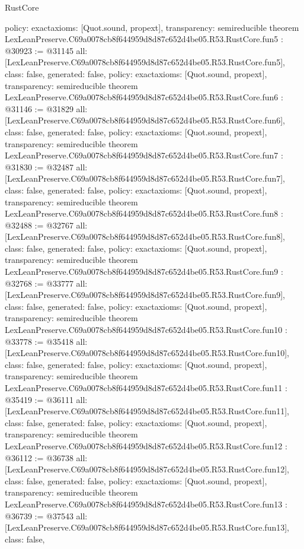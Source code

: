 \begin{lexlean}{RustCore}
\begin{coremodule}
{  policy: exact{axioms: [Quot.sound, propext]},
  transparency: semireducible
}
theorem LexLeanPreserve.C69a0078cb8f644959d8d87c652d4be05.R53.RustCore.fun5 : @30923 := @31145 {
  all: [LexLeanPreserve.C69a0078cb8f644959d8d87c652d4be05.R53.RustCore.fun5],
  class: false,
  generated: false,
  policy: exact{axioms: [Quot.sound, propext]},
  transparency: semireducible
}
theorem LexLeanPreserve.C69a0078cb8f644959d8d87c652d4be05.R53.RustCore.fun6 : @31146 := @31829 {
  all: [LexLeanPreserve.C69a0078cb8f644959d8d87c652d4be05.R53.RustCore.fun6],
  class: false,
  generated: false,
  policy: exact{axioms: [Quot.sound, propext]},
  transparency: semireducible
}
theorem LexLeanPreserve.C69a0078cb8f644959d8d87c652d4be05.R53.RustCore.fun7 : @31830 := @32487 {
  all: [LexLeanPreserve.C69a0078cb8f644959d8d87c652d4be05.R53.RustCore.fun7],
  class: false,
  generated: false,
  policy: exact{axioms: [Quot.sound, propext]},
  transparency: semireducible
}
theorem LexLeanPreserve.C69a0078cb8f644959d8d87c652d4be05.R53.RustCore.fun8 : @32488 := @32767 {
  all: [LexLeanPreserve.C69a0078cb8f644959d8d87c652d4be05.R53.RustCore.fun8],
  class: false,
  generated: false,
  policy: exact{axioms: [Quot.sound, propext]},
  transparency: semireducible
}
theorem LexLeanPreserve.C69a0078cb8f644959d8d87c652d4be05.R53.RustCore.fun9 : @32768 := @33777 {
  all: [LexLeanPreserve.C69a0078cb8f644959d8d87c652d4be05.R53.RustCore.fun9],
  class: false,
  generated: false,
  policy: exact{axioms: [Quot.sound, propext]},
  transparency: semireducible
}
theorem LexLeanPreserve.C69a0078cb8f644959d8d87c652d4be05.R53.RustCore.fun10 : @33778 := @35418 {
  all: [LexLeanPreserve.C69a0078cb8f644959d8d87c652d4be05.R53.RustCore.fun10],
  class: false,
  generated: false,
  policy: exact{axioms: [Quot.sound, propext]},
  transparency: semireducible
}
theorem LexLeanPreserve.C69a0078cb8f644959d8d87c652d4be05.R53.RustCore.fun11 : @35419 := @36111 {
  all: [LexLeanPreserve.C69a0078cb8f644959d8d87c652d4be05.R53.RustCore.fun11],
  class: false,
  generated: false,
  policy: exact{axioms: [Quot.sound, propext]},
  transparency: semireducible
}
theorem LexLeanPreserve.C69a0078cb8f644959d8d87c652d4be05.R53.RustCore.fun12 : @36112 := @36738 {
  all: [LexLeanPreserve.C69a0078cb8f644959d8d87c652d4be05.R53.RustCore.fun12],
  class: false,
  generated: false,
  policy: exact{axioms: [Quot.sound, propext]},
  transparency: semireducible
}
theorem LexLeanPreserve.C69a0078cb8f644959d8d87c652d4be05.R53.RustCore.fun13 : @36739 := @37543 {
  all: [LexLeanPreserve.C69a0078cb8f644959d8d87c652d4be05.R53.RustCore.fun13],
  class: false,
}
\end{coremodule}
\end{lexlean}
